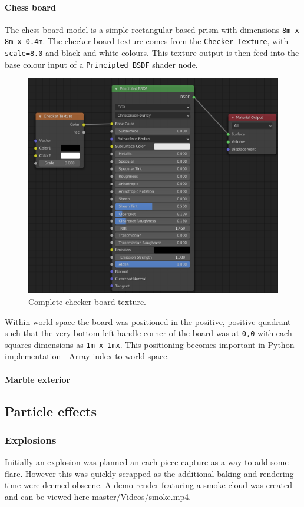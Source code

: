 \documentclass[11pt]{article}
\begin{document}
\paragraph{Chess board}
\label{sec:orge86d637}
The chess board model is a simple rectangular based prism with dimensions \texttt{8m x
8m x 0.4m}. The checker board texture comes from the \texttt{Checker Texture}, with
\texttt{scale=8.0} and black and white colours. This texture output is then feed into
the base colour input of a \texttt{Principled BSDF} shader node.

\begin{figure}[htbp]
\centering
\includegraphics[width=350pt]{Images/checker texture.png}
\caption{\label{checker-texture}Complete checker board texture.}
\end{figure}

Within world space the board was positioned in the positive, positive quadrant
such that the very bottom left handle corner of the board was at \texttt{0,0}
with each squares dimensions as \texttt{1m x 1mx}. This positioning becomes important
in \hyperref[sec:org027462f]{Python implementation - Array index to world space}.
\paragraph{Marble exterior}
\label{sec:orgb33ccbc}
\subsection{Particle effects}
\label{sec:org67c532d}
\subsubsection{Explosions}
\label{sec:org3dceace}
Initially an explosion was planned an each piece capture as a way to add some
flare. However this was quickly scrapped as the additional baking and rendering time
were deemed obscene. A demo render featuring a smoke cloud was created and can
be viewed here \href{https://github.com/Jake-Moss/blender-chess/blob/master/Videos/smoke.mp4}{master/Videos/smoke.mp4}.
\end{document}
